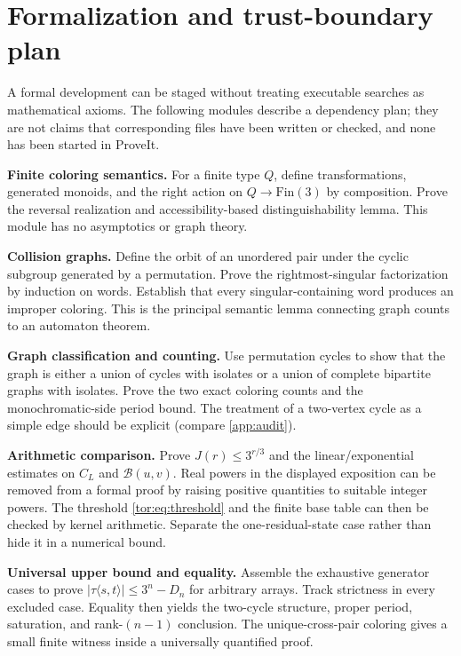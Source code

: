 \documentclass[11pt,a4paper]{article}
\numberwithin{equation}{section}
\theoremstyle{definition}
\theoremstyle{remark}
\newcommand{\Bip}{\mathcal B}
\begin{document}
\section{Formalization and trust-boundary plan}\label{tor:sec:formal}

A formal development can be staged without treating executable searches as
mathematical axioms. The following modules describe a dependency plan; they
are not claims that corresponding files have been written or checked, and
none has been started in ProveIt.

\par\medskip\noindent\textbf{Finite coloring semantics.} For a finite type
$Q$, define transformations, generated monoids, and the right action on
$Q\to\mathrm{Fin}(3)$ by composition. Prove the reversal realization and
accessibility-based distinguishability lemma. This module has no asymptotics
or graph theory.

\par\medskip\noindent\textbf{Collision graphs.} Define the orbit of an
unordered pair under the cyclic subgroup generated by a permutation. Prove the
rightmost-singular factorization by induction on words. Establish that every
singular-containing word produces an improper coloring. This is the principal
semantic lemma connecting graph counts to an automaton theorem.

\par\medskip\noindent\textbf{Graph classification and counting.} Use
permutation cycles to show that the graph is either a union of cycles with
isolates or a union of complete bipartite graphs with isolates. Prove the two
exact coloring counts and the monochromatic-side period bound. The treatment
of a two-vertex cycle as a simple edge should be explicit (compare
\cref{app:audit}).

\par\medskip\noindent\textbf{Arithmetic comparison.} Prove $J(r)\le3^{r/3}$
and the linear/exponential estimates on $C_L$ and $\Bip(u,v)$. Real powers in
the displayed exposition can be removed from a formal proof by raising
positive quantities to suitable integer powers. The threshold
\eqref{tor:eq:threshold} and the finite base table can then be checked by
kernel arithmetic. Separate the one-residual-state case rather than hide it
in a numerical bound.

\par\medskip\noindent\textbf{Universal upper bound and equality.} Assemble
the exhaustive generator cases to prove $|\tau\langle s,t\rangle|\le3^n-D_n$
for arbitrary arrays. Track strictness in every excluded case. Equality then
yields the two-cycle structure, proper period, saturation, and
rank-$(n-1)$ conclusion. The unique-cross-pair coloring gives a small finite
witness inside a universally quantified proof.
\end{document}
